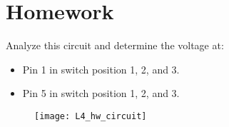 \documentclass[10pt]{article}
\begin{document}
\clearpage


\section*{Homework}
Analyze this circuit and determine the voltage at:

\begin{itemize}
	\item Pin 1 in switch position 1, 2, and 3.
	\item Pin 5 in switch position 1, 2, and 3.
\end{itemize}

\begin{figure}[ht]
	\centering
	\texttt{[image: L4\_hw\_circuit]}
\end{figure}
\end{document}
